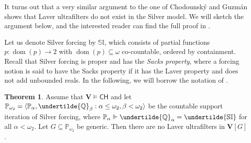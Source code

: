 \documentclass[12pt]{article}
\theoremstyle{definition}
\newtheorem{thm}[nummer]{\sc Theorem}
\newcommand\dom{\operatorname{dom}}
\begin{document}
It turns out that a very similar argument to the one of Chodounsk\'y and Guzm\'an \cite{chodguz-ppoints} shows that Laver ultrafilters do not exist in the Silver model. We will sketch the argument below, and the interested reader can find the full proof in \cite{chodguz-ppoints}.

Let us denote Silver forcing by $\mathbb{SI}$, which consists of partial functions $p:\dom(p)\to 2$ with $\dom(p)\subseteq \omega$ co-countable, ordered by containment. Recall that Silver forcing is proper and has the \emph{Sacks property}, where a forcing notion is said to have the Sacks property if it has the Laver property and does not add unbounded reals. In the following, we will borrow the notation of \cite{chodguz-ppoints}.

\begin{thm}\label{silverthm}
Assume that $\mathbf{V}\vDash \textsf{CH}$ and let $\mathbb{P}_{\omega_2}=\langle \mathbb{P}_{\alpha}, \undertilde{\mathbb{Q}}_{\beta} : \alpha\leq\omega_2, \beta<\omega_2\rangle$ be the countable support iteration of Silver forcing, where $\mathbb{P}_{\alpha}\Vdash \undertilde{\mathbb{Q}}_{\alpha}=\undertilde{\mathbb{SI}}$ for all $\alpha<\omega_2$. Let $G\subseteq \mathbb{P}_{\omega_2}$ be generic. Then there are no Laver ultrafilters in $\mathbf{V}[G]$.
\end{thm}
\end{document}
